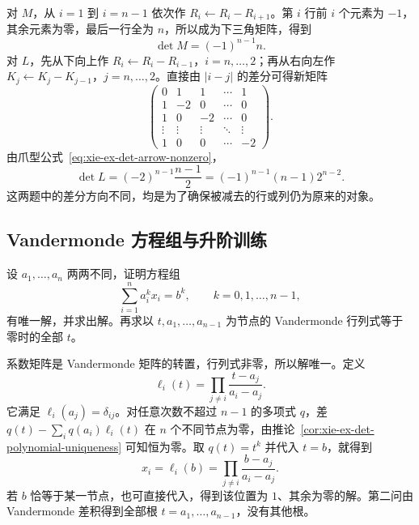 \begin{solve}
对 $M$，从 $i=1$ 到 $i=n-1$ 依次作 $R_i\leftarrow R_i-R_{i+1}$。第 $i$ 行前 $i$ 个元素为 $-1$，其余元素为零，最后一行全为 $n$，所以成为下三角矩阵，得到
\begin{equation}
\label{eq:xie-ex-det-max}
\det M=(-1)^{n-1}n.
\end{equation}
对 $L$，先从下向上作 $R_i\leftarrow R_i-R_{i-1}$，$i=n,\ldots,2$；再从右向左作 $K_j\leftarrow K_j-K_{j-1}$，$j=n,\ldots,2$。直接由 $|i-j|$ 的差分可得新矩阵
\[
\begin{pmatrix}
0&1&1&\cdots&1\\
1&-2&0&\cdots&0\\
1&0&-2&\cdots&0\\
\vdots&\vdots&\vdots&\ddots&\vdots\\
1&0&0&\cdots&-2
\end{pmatrix}.
\]
由爪型公式~\eqref{eq:xie-ex-det-arrow-nonzero}，
\begin{equation}
\label{eq:xie-ex-det-distance}
\det L=(-2)^{n-1}\frac{n-1}{2}
=(-1)^{n-1}(n-1)2^{n-2}.
\end{equation}
这两题中的差分方向不同，均是为了确保被减去的行或列仍为原来的对象。
\end{solve}

\subsection{Vandermonde 方程组与升阶训练}

\begin{example}
\label{ex:xie-ex-det-vandermonde-system}
设 $a_1,\ldots,a_n$ 两两不同，证明方程组
\[
\sum_{i=1}^{n}a_i^kx_i=b^k,\qquad k=0,1,\ldots,n-1,
\]
有唯一解，并求出解。再求以 $t,a_1,\ldots,a_{n-1}$ 为节点的 Vandermonde 行列式等于零时的全部 $t$。
\end{example}

\begin{solve}
系数矩阵是 Vandermonde 矩阵的转置，行列式非零，所以解唯一。定义
\[
\ell_i(t)=\prod_{j\ne i}\frac{t-a_j}{a_i-a_j}.
\]
它满足 $\ell_i(a_j)=\delta_{ij}$。对任意次数不超过 $n-1$ 的多项式 $q$，差 $q(t)-\sum_iq(a_i)\ell_i(t)$ 在 $n$ 个不同节点为零，由推论~\ref{cor:xie-ex-det-polynomial-uniqueness} 可知恒为零。取 $q(t)=t^k$ 并代入 $t=b$，就得到
\[
x_i=\ell_i(b)=\prod_{j\ne i}\frac{b-a_j}{a_i-a_j}.
\]
若 $b$ 恰等于某一节点，也可直接代入，得到该位置为 $1$、其余为零的解。第二问由 Vandermonde 差积得到全部根 $t=a_1,\ldots,a_{n-1}$，没有其他根。
\end{solve}

